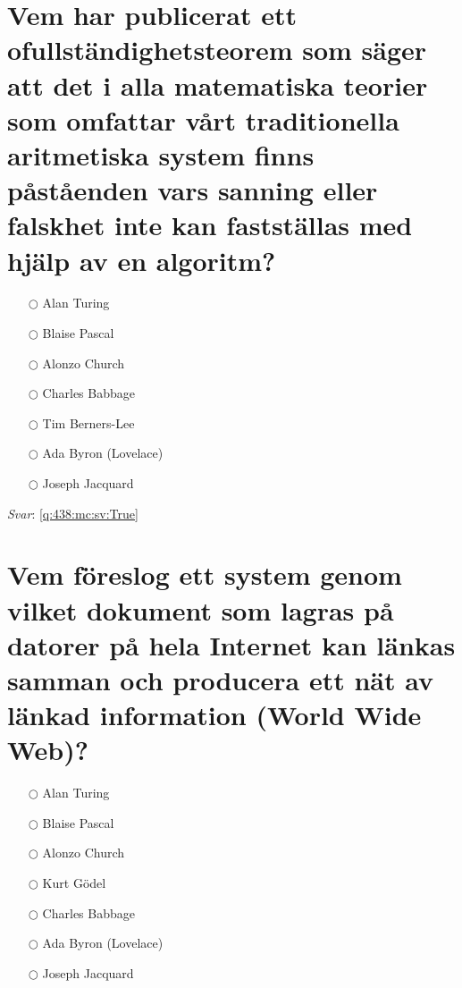 \documentclass[a4paper,11pt,oneside]{book}
\begin{document}
\begin{sloppypar}
\section{Vem har publicerat ett ofullst\"andighetsteorem som s\"ager att det i alla matematiska teorier som omfattar v\r{a}rt traditionella aritmetiska system finns p\r{a}st\r{a}enden vars sanning eller falskhet inte kan fastst\"allas med hj\"alp av en algoritm?}

\label{q:438:mc:sv:False}

\begin{itemize}
  \item[$\bigcirc$] Alan Turing
  \item[$\bigcirc$] Blaise Pascal
  \item[$\bigcirc$] Alonzo Church
  \item[$\bigcirc$] Charles Babbage
  \item[$\bigcirc$] Tim Berners-Lee
  \item[$\bigcirc$] Ada Byron (Lovelace)
  \item[$\bigcirc$] Joseph Jacquard
\end{itemize}

\vspace{1cm}

\textit{Svar}: \autoref{q:438:mc:sv:True}



\section{Vem f\"oreslog ett system genom vilket dokument som lagras p\r{a} datorer p\r{a} hela Internet kan l\"ankas samman och producera ett n\"at av l\"ankad information (World Wide Web)?}

\label{q:439:mc:sv:False}

\begin{itemize}
  \item[$\bigcirc$] Alan Turing
  \item[$\bigcirc$] Blaise Pascal
  \item[$\bigcirc$] Alonzo Church
  \item[$\bigcirc$] Kurt G\"odel
  \item[$\bigcirc$] Charles Babbage
  \item[$\bigcirc$] Ada Byron (Lovelace)
  \item[$\bigcirc$] Joseph Jacquard
\end{itemize}

\vspace{1cm}


\end{sloppypar}
\end{document}
